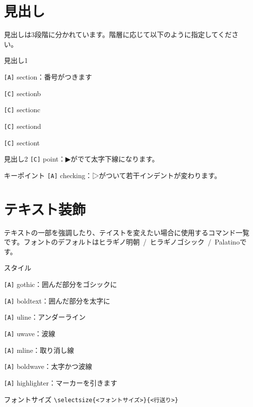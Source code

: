 \begin{multicols*}{2}
\section{見出し}
見出しは3段階に分かれています。階層に応じて以下のように指定してください。
\begin{framebox-simple}{見出し1}
    \begin{reitemize}
        \item \verb|[A]| section：番号がつきます
        \item \verb|[C]| sectionb
        \item \verb|[C]| sectionc
        \item \verb|[C]| sectiond
        \item \verb|[C]| sectiont
    \end{reitemize}
\end{framebox-simple}
\begin{framebox-simple}{見出し2}
    \verb|[C]| point：▶︎がでて太字下線になります。
\end{framebox-simple}
\begin{framebox-simple}{キーポイント}
    \verb|[A]| checking：▷がついて若干インデントが変わります。
\end{framebox-simple}

\section{テキスト装飾}
テキストの一部を強調したり、テイストを変えたい場合に使用するコマンド一覧です。フォントのデフォルトはヒラギノ明朝~/~ヒラギノゴシック~/~Palatinoです。
\begin{framebox-simple}{スタイル}
    \begin{reitemize}
        \item \verb|[A]| gothic：囲んだ部分をゴシックに
        \item \verb|[A]| boldtext：囲んだ部分を太字に
        \item \verb|[A]| uline：アンダーライン
        \item \verb|[A]| uwave：波線
        \item \verb|[A]| mline：取り消し線
        \item \verb|[A]| boldwave：太字かつ波線
        \item \verb|[A]| highlighter：マーカーを引きます
    \end{reitemize}
\end{framebox-simple}
\begin{framebox-simple}{フォントサイズ}
\verb|\selectsize{<フォントサイズ>}{<行送り>}|\\


\end{framebox-simple}
\end{multicols*}
